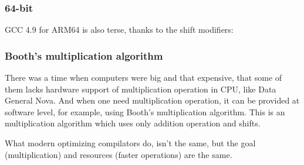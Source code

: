 \subsubsection{64-bit}







GCC 4.9 for ARM64 is also terse, thanks to the shift modifiers:



\subsubsection{Booth's multiplication algorithm}

There was a time when computers were big and that expensive, that some of them lacks hardware support of multiplication
operation in \ac{CPU}, like Data General Nova.
And when one need multiplication operation, it can be provided at software level, for example, using Booth's multiplication
algorithm.
This is an multiplication algorithm which uses only addition operation and shifts.

What modern optimizing compilators do, isn't the same,
but the goal (multiplication) and resources (faster operations) are the same.


